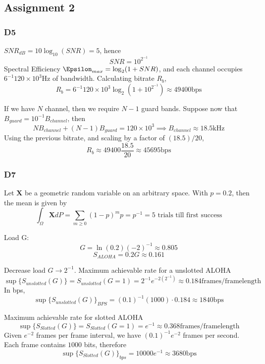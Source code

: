 \documentclass[../main.tex]{subfiles}
\begin{document}
\providecommand{\pow}[1]{\times 10^{#1}}
\providecommand{\framelength}{\mathrm{frames/frame length}}
\providecommand{\bps}{\mathrm{bps}} %
\providecommand{\khz}{\mathrm{kHz}} %
\providecommand{\hz}{\mathrm{Hz}}
\subsection{Assignment 2}
\subsubsection{D5}
\begin{enumalpha}
\item $SNR_{dB}=10\log_{10}(SNR)=5$, hence
\[SNR = 10^{2^{-1}}\]
Spectral Efficiency $\Epsilon_{max} = \log_2(1+SNR)$, and each channel occupies $6^{-1}120\pow{3}$Hz of bandwidth. Calculating bitrate $R_b$,
\[R_b=6^{-1}120\pow{3}\log_2(1+10^{2^{-1}})\approx 49400\mathrm{bps}\]
\item If we have $N$ channel, then we require $N-1$ guard bands. Suppose now that $B_{guard}=10^{-1}B_{channel}$, then 
\[NB_{channel}+(N-1)B_{guard}=120\pow{3}\implies B_{channel}\approx 18.5\mathrm{kHz}\]
Using the previous bitrate, and scaling by a factor of $(18.5)/20$, 
\[R_b\approx 49400\dfrac{18.5}{20}\approx 45695\mathrm{bps}\]
\end{enumalpha}
\subsubsection{D7}
\begin{enumalpha}
\item Let $\mathbf{X}$ be a geometric random variable on an arbitrary space. With $p=0.2$, then the mean is given by
\[\int_\Omega \mathbf{X}dP=\sum_{m\geq 0}(1-p)^mp=p^{-1}=5\text{ trials till first success}\]
\item Load G:
\[
G = \ln(0.2)(-2)^{-1}\approx 0.805
\]
\[S_{ALOHA}=0.2G\approx 0.161\]
\item Decrease load $G\to 2^{-1}$. Maximum achievable rate for a unslotted ALOHA
\[\sup\biggl\{S_{unslotted}(G)\biggr\}=S_{unslotted}(G=1)=2^{-1}e^{-2(2^{-1})}\approx 0.184\framelength\]
In bps, 
\[\sup\biggl\{S_{unslotted}(G)\biggr\}_{BPS}=(0.1)^{-1}(1000)\cdot 0.184\approx 1840\mathrm{bps}\]
\item Maximum achievable rate for slotted ALOHA
\[
\sup\biggl\{S_{Slotted}(G)\biggr\} = S_{Slotted}(G=1)=e^{-1}\approx 0.368\framelength
\]
Given $e^{-2}$ frames per frame interval, we have $(0.1)^{-1}e^{-2}$ frames per second. Each frame contains $1000$ bits, therefore 
\[
\sup\biggl\{S_{Slotted}(G)\biggr\}_{bps} = 10000e^{-1}\approx 3680\mathrm{bps}
\]

\end{enumalpha}
\end{document}
